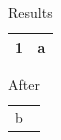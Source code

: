 \documentclass{article}
\begin{document}
\begin{longtable}{|l|l|}
\caption{Results}\\\hline
1 & a\\\hline
\end{longtable}
\begin{table}
\caption{After}
\begin{tabular}{l}b\end{tabular}
\end{table}
\end{document}
